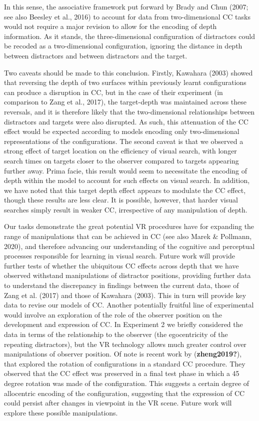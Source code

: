 \documentclass[
  english,
  man,floatsintext]{apa7}
\begin{document}
In this sense, the associative framework put forward by Brady and Chun (2007; see also Beesley et al., 2016) to account for data from two-dimensional CC tasks would not require a major revision to allow for the encoding of depth information. As it stands, the three-dimensional configuration of distractors could be recoded as a two-dimensional configuration, ignoring the distance in depth between distractors and between distractors and the target.

Two caveats should be made to this conclusion. Firstly, Kawahara (2003) showed that reversing the depth of two surfaces within previously learnt configurations can produce a disruption in CC, but in the case of their experiment (in comparison to Zang et al., 2017), the target-depth was maintained across these reversals, and it is therefore likely that the two-dimensional relationships between distractors and targets were also disrupted. As such, this attenuation of the CC effect would be expected according to models encoding only two-dimensional representations of the configurations. The second caveat is that we observed a strong effect of target location on the efficiency of visual search, with longer search times on targets closer to the observer compared to targets appearing further away. Prima facie, this result would seem to necessitate the encoding of depth within the model to account for such effects on visual search. In addition, we have noted that this target depth effect appears to modulate the CC effect, though these results are less clear. It is possible, however, that harder visual searches simply result in weaker CC, irrespective of any manipulation of depth.

Our tasks demonstrate the great potential VR procedures have for expanding the range of manipulations that can be achieved in CC (see also Marek \& Pollmann, 2020), and therefore advancing our understanding of the cognitive and perceptual processes responsible for learning in visual search. Future work will provide further tests of whether the ubiquitous CC effects across depth that we have observed withstand manipulations of distractor positions, providing further data to understand the discrepancy in findings between the current data, those of Zang et al. (2017) and those of Kawahara (2003). This in turn will provide key data to revise our models of CC. Another potentially fruitful line of experimental would involve an exploration of the role of the observer position on the development and expression of CC. In Experiment 2 we briefly considered the data in terms of the relationship to the observer (the egocentricity of the repeating distractors), but the VR technology allows much greater control over manipulations of observer position. Of note is recent work by (\textbf{zheng2019?}), that explored the rotation of configurations in a standard CC procedure. They observed that the CC effect was preserved in a final test phase in which a 45 degree rotation was made of the configuration. This suggests a certain degree of allocentric encoding of the configuration, suggesting that the expression of CC could persist after changes in viewpoint in the VR scene. Future work will explore these possible manipulations.
\end{document}
